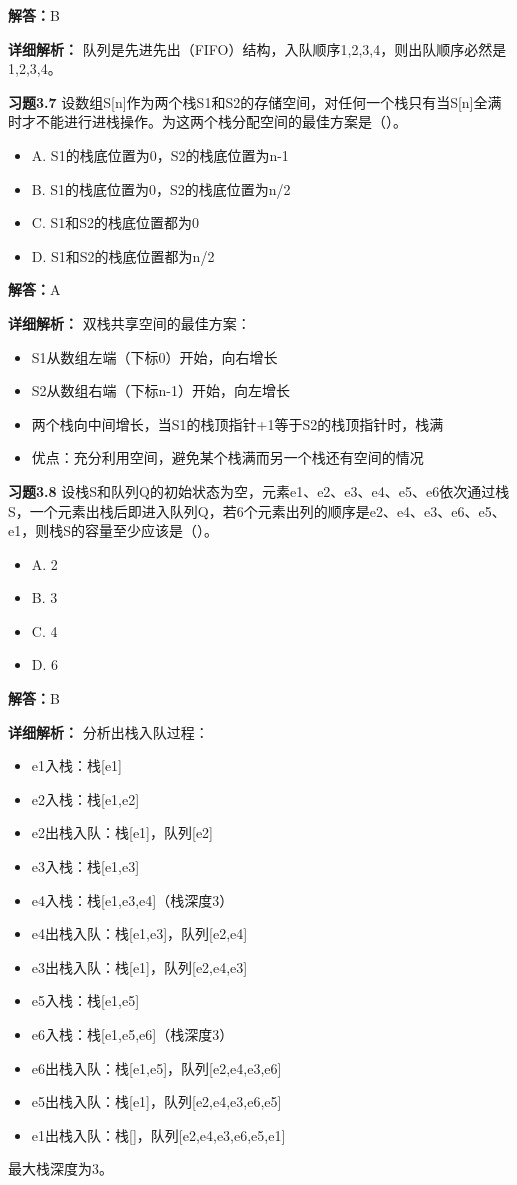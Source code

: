 \documentclass[12pt,a4paper]{amsart}
\begin{document}
\textbf{解答：}B

\textbf{详细解析：}
队列是先进先出（FIFO）结构，入队顺序1,2,3,4，则出队顺序必然是1,2,3,4。

\textbf{习题3.7} 设数组S[n]作为两个栈S1和S2的存储空间，对任何一个栈只有当S[n]全满时才不能进行进栈操作。为这两个栈分配空间的最佳方案是（\quad）。
\begin{itemize}
\item A. S1的栈底位置为0，S2的栈底位置为n-1
\item B. S1的栈底位置为0，S2的栈底位置为n/2
\item C. S1和S2的栈底位置都为0
\item D. S1和S2的栈底位置都为n/2
\end{itemize}

\textbf{解答：}A

\textbf{详细解析：}
双栈共享空间的最佳方案：
\begin{itemize}
\item S1从数组左端（下标0）开始，向右增长
\item S2从数组右端（下标n-1）开始，向左增长
\item 两个栈向中间增长，当S1的栈顶指针+1等于S2的栈顶指针时，栈满
\item 优点：充分利用空间，避免某个栈满而另一个栈还有空间的情况
\end{itemize}

\textbf{习题3.8} 设栈S和队列Q的初始状态为空，元素e1、e2、e3、e4、e5、e6依次通过栈S，一个元素出栈后即进入队列Q，若6个元素出列的顺序是e2、e4、e3、e6、e5、e1，则栈S的容量至少应该是（\quad）。
\begin{itemize}
\item A. 2
\item B. 3
\item C. 4
\item D. 6
\end{itemize}

\textbf{解答：}B

\textbf{详细解析：}
分析出栈入队过程：
\begin{itemize}
\item e1入栈：栈[e1]
\item e2入栈：栈[e1,e2]
\item e2出栈入队：栈[e1]，队列[e2]
\item e3入栈：栈[e1,e3]
\item e4入栈：栈[e1,e3,e4]（栈深度3）
\item e4出栈入队：栈[e1,e3]，队列[e2,e4]
\item e3出栈入队：栈[e1]，队列[e2,e4,e3]
\item e5入栈：栈[e1,e5]
\item e6入栈：栈[e1,e5,e6]（栈深度3）
\item e6出栈入队：栈[e1,e5]，队列[e2,e4,e3,e6]
\item e5出栈入队：栈[e1]，队列[e2,e4,e3,e6,e5]
\item e1出栈入队：栈[]，队列[e2,e4,e3,e6,e5,e1]
\end{itemize}
最大栈深度为3。
\end{document}
